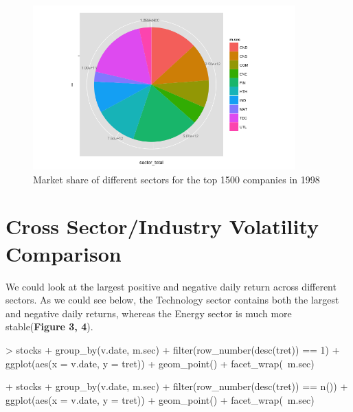 \begin{figure}[h!]
  \centering
    \includegraphics[width=0.9\textwidth]{PIE1}
  \caption{Market share of different sectors for the top 1500 companies in 1998}
\end{figure}

\section{Cross Sector/Industry Volatility Comparison}

\noindent We could look at the largest positive and negative daily return across different sectors. As we could see below, the Technology sector contains both the largest and negative daily returns, whereas the Energy sector is much more stable(\textbf{Figure 3, 4}). 

\begin{example}
> stocks  %
+  group_by(v.date, m.sec)  %
+  filter(row_number(desc(tret)) == 1)  %
+  ggplot(aes(x = v.date, y = tret)) + geom_point() + facet_wrap(~m.sec)

+ stocks  %
+  group_by(v.date, m.sec)  %
+  filter(row_number(desc(tret)) == n())  %
+  ggplot(aes(x = v.date, y = tret)) + geom_point() + facet_wrap(~m.sec)
\end{example}

